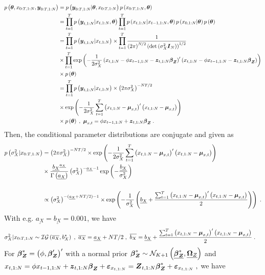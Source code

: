 \begin{align*}
p\left(\ts,x_\seqTN,\bs{y}_\seqTN\right)
&=
p\left(\bs{y}_\seqTN|\ts,x_\seqTN\right)p\left(x_\seqTN,\ts\right)\\
&=
\prodt p\left(\ytn|\xtn,\ts\right)
\prodt p\left(\xtn|\xttn,\ts\right)p\left(x_{0,1:N}|\ts\right)p\left(\ts\right)\;\\
&=
\prodt p\left(\ytn|\xtn\right)
\times
\prodt \frac{1}{\left(2\pi\right)^{N/2}\left(\det\left(\sigma_{X}^2\I{N}\right)\right)^{1/2}}\\
&\times
\prodt \exp \left(-\frac{1}{2\sigma_X^2}\left(\xtn-\phi\xttn-\ztn\bz\right)^{\prime}\left(\xtn-\phi\xttn-\ztn\bz\right)\right)\\
&\times p\left(\ts\right)\;\\
&=
\prodt p\left(\ytn|\xtn\right)\times
\left(2\pi\sigma_{X}^2\right)^{-NT/2}\\
&\times
\exp \left(-\frac{1}{2\sigma_X^2}\sumt\left(\xtn-\mux\right)^{\prime}\left(\xtn-\mux\right)\right)\\
&\times p\left(\ts\right)\;,~\mux=\phi\xttn+\ztn\bz\;.
\end{align*}
Then, the conditional parameter distributions are conjugate and given as
\begin{align*}
p\left(\sigma_X^2|x_{\seqTN}\right)
&=\left(2\pi\sigma_{X}^2\right)^{-NT/2}
\times
\exp \left(-\frac{1}{2\sigma_X^2}\sumt\left(\xtn-\mux\right)^{\prime}\left(\xtn-\mux\right)\right)\\
&\times \frac{\underline{b_X}^{\underline{a_X}}}{\Gamma\left(\underline{a_X}\right)}\left(\sigma_X^2\right)^{-\underline{a_X}-1}\exp\left(-\frac{\underline{b_X}}{\sigma_X^2}\right)\\
\\
&\pt \left(\sigma_X^2\right)^{-(\underline{a_X}+NT/2)-1}
\times\exp
\left(
-\frac{1}{\sigma_X^2}
\left(
\underline{b_X}+\frac{\sumt\left(\xtn-\mux\right)^{\prime}\left(\xtn-\mux\right)}{2}
\right)
\right)\;.
\end{align*}
With e.g. $\underline{a_X}=\underline{b_X}=0.001$, we have
\begin{align*}
\sigma_X^2|x_\seqTN\sim\IG{\overline{a_X}}{b^*_X}\;,~\overline{a_X}&=\underline{a_X}+NT/2\;,~\overline{b_X}=\underline{b_X}+\frac{\sumt\left(\xtn-\mux\right)^{\prime}\left(\xtn-\mux\right)}{2}\;.
\end{align*}
For $\bz^*=\left(\phi,\bz^{\prime}\right)^{\prime}$ with a normal prior $\bz^*\sim\mathcal{N}_{K+1}\left(\underline{\bz^*}, \Ozprior\right)$ and $\Xtn=\phi\Xttn+\ztn\bz + \ErrXn=\Ztn\bz^* + \ErrXn\;,$ we have
